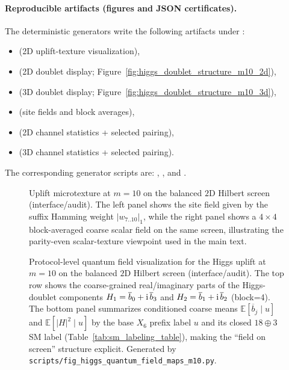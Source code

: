 \paragraph{Reproducible artifacts (figures and JSON certificates).}
\AuditTag The deterministic generators write the following artifacts under :
\begin{itemize}
\item {} (2D uplift-texture visualization),
\item {} (2D doublet display; Figure~\ref{fig:higgs_doublet_structure_m10_2d}),
\item {} (3D doublet display; Figure~\ref{fig:higgs_doublet_structure_m10_3d}),
\item {} (site fields and block averages),
\item {} (2D channel statistics + selected pairing),
\item {} (3D channel statistics + selected pairing).
\end{itemize}
The corresponding generator scripts are:
,
, and
.

\begin{figure}[t]
\centering
{}
\caption{Uplift microtexture at $m=10$ on the balanced $2$D Hilbert screen (interface/audit). The left panel shows the site field given by the suffix Hamming weight $|w_{7..10}|_1$, while the right panel shows a $4\times 4$ block-averaged coarse scalar field on the same screen, illustrating the parity-even scalar-texture viewpoint used in the main text.}
\label{fig:higgs_uplift_texture_m10}
\end{figure}

\begin{figure}[t]
\centering
{}
\caption{Protocol-level quantum field visualization for the Higgs uplift at $m=10$ on the balanced $2$D Hilbert screen (interface/audit). The top row shows the coarse-grained real/imaginary parts of the Higgs-doublet components $H_1=\overline{b}_0+\mathrm{i}\,\overline{b}_3$ and $H_2=\overline{b}_1+\mathrm{i}\,\overline{b}_2$ (block=4). The bottom panel summarizes conditioned coarse means $\mathbb{E}[\overline{b}_j\mid u]$ and $\mathbb{E}[|H|^2\mid u]$ by the base $X_6$ prefix label $u$ and its closed $18\oplus 3$ SM label (Table~\ref{tab:sm_labeling_table}), making the ``field on screen'' structure explicit. Generated by \texttt{scripts/fig\_higgs\_quantum\_field\_maps\_m10.py}.}
\label{fig:higgs_quantum_field_maps_m10}
\end{figure}

